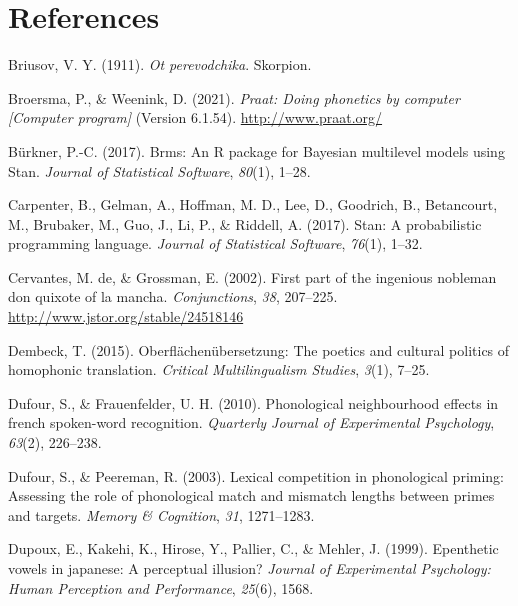 \documentclass[
  man,
  longtable,
  nolmodern,
  notxfonts,
  notimes,
  colorlinks=true,linkcolor=blue,citecolor=blue,urlcolor=blue]{apa7}
\newlength{\cslhangindent}
\newenvironment{CSLReferences}[2] %
 {\begin{list}{}{%
  \setlength{\itemindent}{0pt}
  \setlength{\leftmargin}{0pt}
  \setlength{\parsep}{0pt}
  \ifodd #1
   \setlength{\leftmargin}{\cslhangindent}
   \setlength{\itemindent}{-1\cslhangindent}
  \fi
  \setlength{\itemsep}{#2\baselineskip}}}
 {\end{list}}
\begin{document}
\section*{References}\label{references}

\label{refs}
\begin{CSLReferences}{1}{0}
Briusov, V. Y. (1911). \emph{Ot perevodchika}. Skorpion.

Broersma, P., \& Weenink, D. (2021). \emph{Praat: Doing phonetics by
computer {[}{Computer} program{]}} (Version 6.1.54).
\url{http://www.praat.org/}

Bürkner, P.-C. (2017). Brms: {An R} package for {Bayesian} multilevel
models using {Stan}. \emph{Journal of Statistical Software},
\emph{80}(1), 1--28.

Carpenter, B., Gelman, A., Hoffman, M. D., Lee, D., Goodrich, B.,
Betancourt, M., Brubaker, M., Guo, J., Li, P., \& Riddell, A. (2017).
Stan: {A} probabilistic programming language. \emph{Journal of
Statistical Software}, \emph{76}(1), 1--32.

Cervantes, M. de, \& Grossman, E. (2002). First part of the ingenious
nobleman don quixote of la mancha. \emph{Conjunctions}, \emph{38},
207--225. \url{http://www.jstor.org/stable/24518146}

Dembeck, T. (2015). Oberfl{ä}chen{ü}bersetzung: The poetics and cultural
politics of homophonic translation. \emph{Critical Multilingualism
Studies}, \emph{3}(1), 7--25.

Dufour, S., \& Frauenfelder, U. H. (2010). Phonological neighbourhood
effects in french spoken-word recognition. \emph{Quarterly Journal of
Experimental Psychology}, \emph{63}(2), 226--238.

Dufour, S., \& Peereman, R. (2003). Lexical competition in phonological
priming: {Assessing} the role of phonological match and mismatch lengths
between primes and targets. \emph{Memory \& Cognition}, \emph{31},
1271--1283.

Dupoux, E., Kakehi, K., Hirose, Y., Pallier, C., \& Mehler, J. (1999).
Epenthetic vowels in japanese: A perceptual illusion? \emph{Journal of
Experimental Psychology: Human Perception and Performance},
\emph{25}(6), 1568.


\end{CSLReferences}
\end{document}

